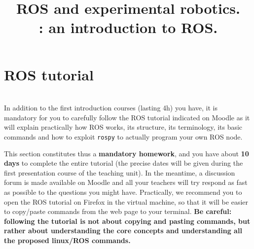 \documentclass[10pt,a4paper,printanswers]{upmc}
\title{ROS and experimental robotics.\\ \Num: an introduction to ROS.}
\newcommand{\myline}{\noindent\makebox[\linewidth]{\rule{\textwidth}{0.7pt}}}
\begin{document}
\maketitle

\section{ROS tutorial}
\label{sec:tutorial}
\vspace{-0.5cm}\myline\\

In addition to the first introduction courses (lasting 4h) you have, it is mandatory for you to
carefully follow the ROS tutorial indicated on Moodle as it will explain practically how ROS works,
its structure, its terminology, its basic commands and how to exploit \texttt{rospy} to actually
program your own ROS node.

This section constitutes thus a \textbf{mandatory homework}, and you have about \textbf{10 days} to
complete the entire tutorial (the precise dates will be given during the first presentation course
of the teaching unit). In the meantime, a discussion forum is made available on Moodle and all your
teachers will try respond as fast as possible to the questions you might have. Practically, we
recommend you to open the ROS tutorial on Firefox in the virtual machine, so that it will be easier
to copy/paste commands from the web page to your terminal. \textbf{Be careful: following the
  tutorial is not about copying and pasting commands, but rather about understanding the core concepts
  and understanding all the proposed linux/ROS commands.}
\end{document}
